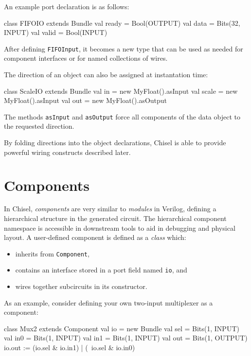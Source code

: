 \documentclass[twocolumn,10pt]{article}
\def\code#1{{\tt #1}}
\begin{document}
An example port declaration is as follows:
\begin{scala}
class FIFOIO extends Bundle {
  val ready = Bool(OUTPUT)
  val data  = Bits(32, INPUT)
  val valid = Bool(INPUT)
}
\end{scala}

\noindent
After defining \code{FIFOInput}, it becomes a new type that can be
used as needed for component interfaces or for named collections of
wires.

The direction of an object can also be assigned at instantation time:
\begin{scala}
class ScaleIO extends Bundle {
  val in    = new MyFloat().asInput
  val scale = new MyFloat().asInput
  val out   = new MyFloat().asOutput
}
\end{scala}

\noindent
The methods \code{asInput} and \code{asOutput} force all components of
the data object to the requested direction.

By folding directions into the object declarations, Chisel is able to
provide powerful wiring constructs described later.



\section{Components}

In Chisel, {\em components} are very similar to {\em modules} in
Verilog, defining a hierarchical structure in the generated circuit.
The hierarchical component namespace is accessible in downstream tools
to aid in debugging and physical layout.  A user-defined component is
defined as a {\em class} which:
\begin{itemize}
\item inherits from \code{Component},
\item contains an interface stored in a port field named \code{io}, and
\item wires together subcircuits in its constructor.
\end{itemize}
As an example, consider defining your own two-input multiplexer as a
component:
\begin{scala}
class Mux2 extends Component {
  val io = new Bundle{
    val sel = Bits(1, INPUT)
    val in0 = Bits(1, INPUT)
    val in1 = Bits(1, INPUT)
    val out = Bits(1, OUTPUT)
  }
  io.out := (io.sel & io.in1) | (~io.sel & io.in0)
}
\end{scala}
\end{document}

